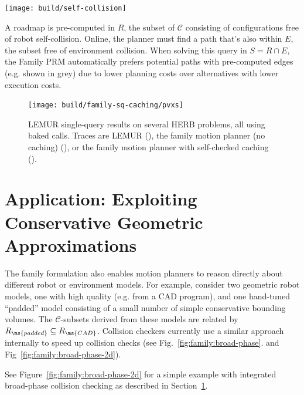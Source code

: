 \begin{marginfigure}
   \centering
   \texttt{[image: build/self-collision]}
   \caption{A roadmap is pre-computed in $R$,
      the subset of $\mathcal{C}$ consisting of configurations free
      of robot self-collision.
      Online, the planner must find a path that's also within $E$,
      the subset free of environment collision.
      When solving this query in $S = R \cap E$,
      the Family PRM automatically prefers potential paths with
      pre-computed edges (e.g. shown in grey)
      due to lower planning costs over alternatives with lower
      execution costs.}
   \label{fig:family:self-collision-example}
\end{marginfigure}

\begin{figure}
   \centering   
   \texttt{[image: build/family-sq-caching/pvxs]}
   \caption[]{LEMUR single-query results on several HERB problems,
      all using baked calls.
      Traces are LEMUR
      (\protect{}),
      the family motion planner (no caching)
      (\protect{}),
      or the family motion planner with self-checked caching
      (\protect{}).}
\end{figure}





\section{Application: Exploiting Conservative Geometric Approximations}
\label{subsec:family:broad-phase}

The family formulation also enables motion planners to
reason directly about different robot or environment models.
For example, consider two geometric robot models,
one with high quality (e.g. from a CAD program),
and one hand-tuned ``padded'' model consisting of 
a small number of simple conservative bounding volumes.
The $\mathcal{C}$-subsets derived from these models
are related by $R_{\ms{padded}} \subseteq R_{\ms{CAD}}$.
Collision checkers currently use a similar approach internally
to speed up collision checks (see Fig.~\ref{fig:family:broad-phase}.
and Fig~\ref{fig:family:broad-phase-2d}).

See Figure~\ref{fig:family:broad-phase-2d}
for a simple example with integrated broad-phase collision checking
as described in Section~\ref{subsec:family:broad-phase}.

